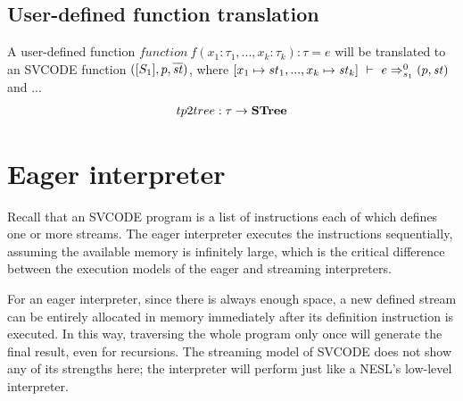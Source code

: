 

\subsection{User-defined function translation}
A user-defined function $function \  f(x_1: \tau_1, ..., x_k: \tau_k): \tau = e $ will be translated to an SVCODE function
$([S_1], p, \overline{\mathit{st}})$, where $\Trans{[x_1 \|-> st_1,..., x_k \|-> \st_k ]}{e}{0}{s_1}{\sfun{p}{\st}}$ and ...
$$ tp2tree : \tau \rightarrow \mathbf{STree}  $$ 


\section{Eager interpreter}
Recall that an SVCODE program is a list of instructions each of which defines one or more streams. 
The eager interpreter executes the instructions sequentially, assuming the available memory is infinitely large, which is the critical difference between the execution models of the eager and streaming interpreters.

For an eager interpreter, since there is always enough space, a new defined stream can be entirely allocated in memory immediately after its definition instruction is executed.
In this way, traversing the whole program only once will generate the final result, even for recursions.
The streaming model of SVCODE does not show any of its strengths here; the interpreter will perform just like a NESL's low-level interpreter. 


